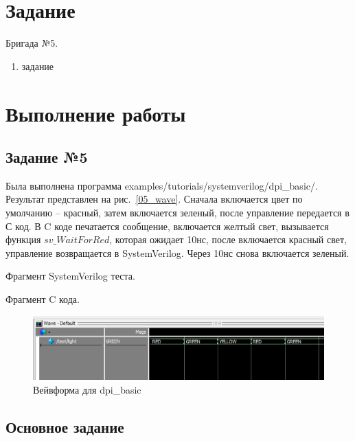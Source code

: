 \documentclass[a4paper,14pt]{article}
\begin{document}
    
    \tableofcontents
    \pagebreak


    \section{Задание}

    Бригада №5.

    \begin{enumerate}
        \item задание
    \end{enumerate}


    \section{Выполнение работы}

    \subsection{Задание №5}

    Была выполнена программа examples/tutorials/systemverilog/dpi_basic/.
    Результат представлен на рис.~\ref{05_wave}.
    Сначала включается цвет по умолчанию -- красный, затем включается зеленый, после управление передается в С код.
    В C коде печатается сообщение, включается желтый свет, вызывается функция $sv\_WaitForRed$, которая ожидает 10нс, 
    после включается красный свет, управление возвращается в SystemVerilog.
    Через 10нс снова включается зеленый.

    Фрагмент SystemVerilog теста.
    {\small {}}

    Фрагмент C кода.
    {\small {}}

    \begin{figure}[H]
        \centering
        \includegraphics[width=\linewidth]{images/05_wave}
        \caption{Вейвформа для dpi_basic}
        \label{fig:05_wave}
    \end{figure}
    
	\subsection{Основное задание}
	
\end{document}
